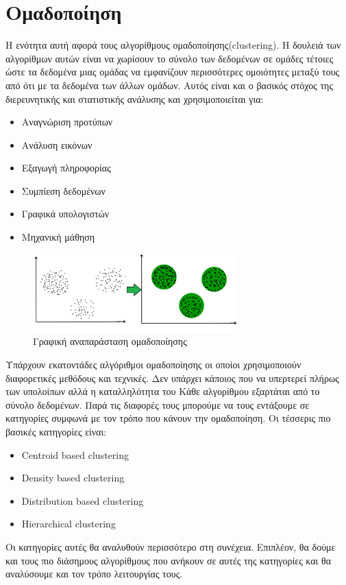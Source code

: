 \newpage
\section{Ομαδοποίηση}
Η ενότητα αυτή αφορά τους αλγορίθμους ομαδοποίησης(\textlatin{clustering}). Η δουλειά των
αλγορίθμων αυτών είναι να χωρίσουν το σύνολο των δεδομένων σε ομάδες τέτοιες ώστε τα δεδομένα μιας
ομάδας να εμφανίζουν περισσότερες ομοιότητες μεταξύ τους από ότι με τα δεδομένα των άλλων ομάδων.
Αυτός είναι και ο βασικός στόχος της διερευνητικής και στατιστικής ανάλυσης και χρησιμοποιείται
για\cite{wikicl}:
\begin{itemize}
    \item Αναγνώριση προτύπων
    \item Ανάλυση εικόνων
    \item Εξαγωγή πληροφορίας
    \item Συμπίεση δεδομένων
    \item Γραφικά υπολογιστών
    \item Μηχανική μάθηση
\end{itemize}
\begin{figure}[H]
    \centering
    \includegraphics[width=0.7\textwidth]{images/clustering_intro.jpg}
    \caption{Γραφική αναπαράσταση ομαδοποίησης}
\end{figure}
\sloppy
Υπάρχουν εκατοντάδες αλγόριθμοι ομαδοποίησης οι οποίοι χρησιμοποιούν διαφορετικές μεθόδους και
τεχνικές. Δεν υπάρχει κάποιος που να υπερτερεί πλήρως των υπολοίπων αλλά η καταλληλότητα του Κάθε
αλγορίθμου εξαρτάται από το σύνολο δεδομένων. Παρά τις διαφορές τους μπορούμε να τους εντάξουμε σε
κατηγορίες συμφωνά με τον τρόπο που κάνουν την ομαδοποίηση. Οι τέσσερις πιο βασικές κατηγορίες
είναι:
\fussy
\begin{itemize}
    \item \textlatin{Centroid based clustering}
    \item \textlatin{Density based clustering}
    \item \textlatin{Distribution based clustering}
    \item \textlatin{Hierarchical clustering}
\end{itemize}
Οι κατηγορίες αυτές θα αναλυθούν περισσότερο στη συνέχεια. Επιπλέον, θα δούμε και τους πιο διάσημους αλγορίθμους που ανήκουν σε αυτές της κατηγορίες και θα αναλύσουμε και τον τρόπο
λειτουργίας τους.

